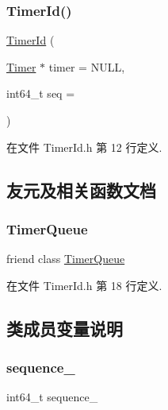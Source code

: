 \subsubsection{\texorpdfstring{Timer\+Id()}{TimerId()}}
{\footnotesize\ttfamily \hyperlink{classmuduo_1_1TimerId}{Timer\+Id} (\begin{DoxyParamCaption}\item[{\hyperlink{classmuduo_1_1Timer}{Timer} $\ast$}]{timer = {\ttfamily NULL},  }\item[{int64\+\_\+t}]{seq = {} }\end{DoxyParamCaption})\hspace{0.3cm}{\ttfamily [inline]}}



在文件 Timer\+Id.\+h 第 12 行定义.



\subsection{友元及相关函数文档}
\mbox{\label{classmuduo_1_1TimerId_a865df28c10927729363ac18d3d83f35b}} 
\subsubsection{\texorpdfstring{Timer\+Queue}{TimerQueue}}
{\footnotesize\ttfamily friend class \hyperlink{classmuduo_1_1TimerQueue}{Timer\+Queue}\hspace{0.3cm}{\ttfamily [friend]}}



在文件 Timer\+Id.\+h 第 18 行定义.



\subsection{类成员变量说明}
\mbox{\label{classmuduo_1_1TimerId_a16b9981eba82482428dd663754b65888}} 
\subsubsection{\texorpdfstring{sequence\+\_\+}{sequence\_}}
{\footnotesize\ttfamily int64\+\_\+t sequence\+\_\+\hspace{0.3cm}{\ttfamily [private]}}



